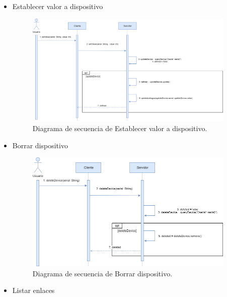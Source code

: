 \begin{itemize}
    \item Establecer valor a dispositivo     
    
    \vspace{5mm}

    \begin{figure}[h!]
        \centering
        \includegraphics[width=10cm]{imagenes/diagramas/diagrama_secuencia_valor}
        \caption{Diagrama de secuencia de Establecer valor a dispositivo.}
        \label{fig:secuencia-de-establecer-valor-dispositivo}
    \end{figure}

    \newpage

    \item Borrar dispositivo     
    
    \vspace{5mm}

    \begin{figure}[h!]
        \centering
        \includegraphics[width=10cm]{imagenes/diagramas/diagrama_secuencia_borrard}
        \caption{Diagrama de secuencia de Borrar dispositivo.}
        \label{fig:secuencia-de-borrar-dispositivo}
    \end{figure}

    \item Listar enlaces     
    
    \vspace{5mm}


\end{itemize}
